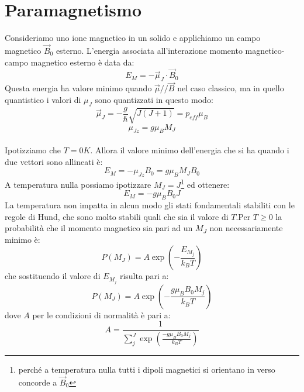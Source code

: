 \documentclass{book}
\begin{document}
     \section{Paramagnetismo}
     Consideriamo uno ione magnetico in un solido e applichiamo un campo magnetico $\vec{B}_{0}$ esterno. L'energia associata all'interazione momento magnetico-campo magnetico esterno è data da:
     \begin{equation}
         E_{M} = - \vec{\mu}_{J} \cdot \vec{B}_{0}
     \end{equation}
     Questa energia ha valore minimo quando $\vec{\mu} // \vec{B}$ nel caso classico, ma in quello quantistico i valori di $\mu_{J}$ sono quantizzati in questo modo:
     \begin{equation}
         \vec{\mu}_{J} = -\frac{g}{\hbar} \sqrt{J(J+1)} = p_{eff}\mu_{B}
     \end{equation}
     \begin{equation}
         \mu_{Jz} = g \mu_{B} M_{J}
     \end{equation}\\
     Ipotizziamo che $T=0K$. Allora il valore minimo dell'energia che si ha quando i due vettori sono allineati è:
     \begin{equation}
         E_{M} = -\mu_{Jz}B_{0} = g\mu_{B}M_{J}B_{0}
     \end{equation}
     A temperatura nulla possiamo ipotizzare $M_{J} = J$\footnote{perché a temperatura nulla tutti i dipoli magnetici si orientano in verso concorde a $\vec{B}_{0}$} ed ottenere:
     \begin{equation}
         E_{M} = -g \mu_{B}B_{0}J
     \end{equation}
     La temperatura non impatta in alcun modo gli stati fondamentali stabiliti con le regole di Hund, che sono molto stabili quali che sia il valore di $T$.Per $T\geq 0$ la probabilità che il momento magnetico sia pari ad un $M_{J}$ non necessariamente minimo è:
     \begin{equation}
         P(M_{J}) = A\exp{(-\frac{E_{M_{j}}}{k_{B}T})}
     \end{equation}
     che sostituendo il valore di $E_{M_{j}}$ risulta pari a:
     \begin{equation}
         P(M_{J}) = A\exp{(-\frac{g\mu_{B}B_{0}M_{j}}{k_{B}T})}
     \end{equation}
     dove $A$ per le condizioni di normalità è pari a:
     \begin{equation}
         A = \frac{1}{\sum_{j} ^{J} \exp{(\frac{-g \mu_{B}B_{0}M_{j}}{k_{B}T})}}
     \end{equation}
\end{document}
